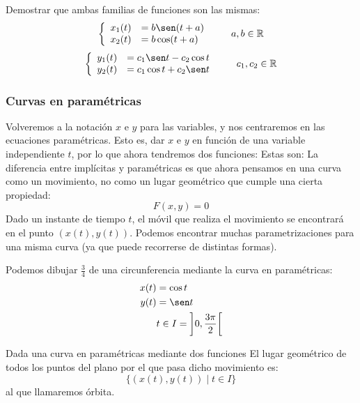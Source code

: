 \begin{ejercicio*}
    Demostrar que ambas familias de funciones son las mismas:
    \begin{equation*}
        \left\{\begin{array}{rl}
                x_1(t) &= b \sen (t+a) \\
                x_2(t) &= b \cos (t+a)
        \end{array}\right. \qquad a,b \in \mathbb{R}
    \end{equation*}
    \begin{equation*}
        \left\{\begin{array}{rl}
                y_1(t) &= c_1 \sen t - c_2 \cos t \\
                y_2(t) &= c_1 \cos t + c_2 \sen t
        \end{array}\right. \qquad c_1, c_2 \in \mathbb{R}
    \end{equation*}
\end{ejercicio*}

\subsubsection{Curvas en paramétricas}
Volveremos a la notación $x$ e $y$ para las variables, y nos centraremos en las ecuaciones paramétricas. Esto es, dar $x$ e $y$ en función de una variable independiente $t$, por lo que ahora tendremos dos funciones:
Estas son:
La diferencia entre implícitas y paramétricas es que ahora pensamos en una curva como un movimiento, no como un lugar geométrico que cumple una cierta propiedad: 
\begin{equation*}
    F(x,y) = 0
\end{equation*}
Dado un instante de tiempo $t$, el móvil que realiza el movimiento se encontrará en el punto $(x(t), y(t))$.
Podemos encontrar muchas parametrizaciones para una misma curva (ya que puede recorrerse de distintas formas).
\begin{ejemplo}
    Podemos dibujar $\frac{3}{4}$ de una circunferencia mediante la curva en paramétricas:
    \begin{align*}
        x(t) &= \cos t \\
        y(t) &= \sen t \\
             & t \in I=\left]0, \dfrac{3\pi}{2}\right[
    \end{align*}
\end{ejemplo}

\begin{definicion}[Órbita]
Dada una curva en paramétricas mediante dos funciones
El lugar geométrico de todos los puntos del plano por el que pasa dicho movimiento es:
\begin{equation*}
    \{(x(t),y(t)) \mid t\in I\}
\end{equation*}
al que llamaremos órbita.
\end{definicion}

